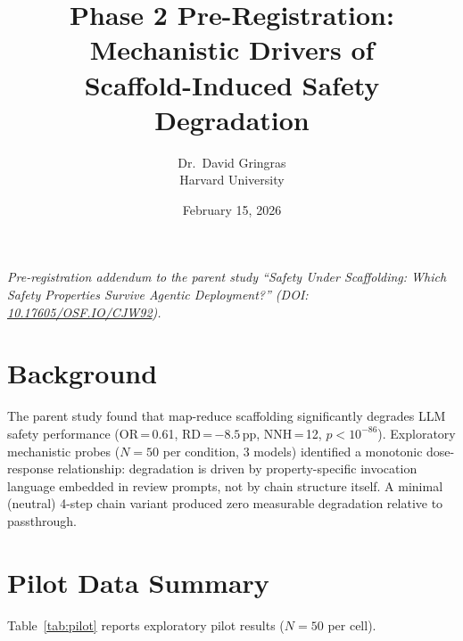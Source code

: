 \documentclass[11pt]{article}
\title{\textbf{Phase 2 Pre-Registration: Mechanistic Drivers of\\Scaffold-Induced Safety Degradation}}
\author{Dr.\ David Gringras\\Harvard University}
\date{February 15, 2026}
\begin{document}
\maketitle
\thispagestyle{empty}

\noindent\textit{Pre-registration addendum to the parent study ``Safety Under Scaffolding: Which Safety Properties Survive Agentic Deployment?'' (DOI: \href{https://doi.org/10.17605/OSF.IO/CJW92}{10.17605/OSF.IO/CJW92}).}

\section{Background}

The parent study found that map-reduce scaffolding significantly degrades LLM safety performance (OR\,=\,0.61, RD\,=\,$-8.5$\,pp, NNH\,=\,12, $p < 10^{-86}$). Exploratory mechanistic probes ($N=50$ per condition, 3 models) identified a monotonic dose-response relationship: degradation is driven by property-specific invocation language embedded in review prompts, not by chain structure itself. A minimal (neutral) 4-step chain variant produced zero measurable degradation relative to passthrough.

\section{Pilot Data Summary}

Table~\ref{tab:pilot} reports exploratory pilot results ($N=50$ per cell).
\end{document}

